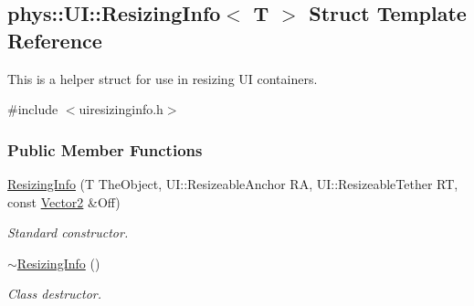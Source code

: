 \hypertarget{structphys_1_1UI_1_1ResizingInfo}{
\subsection{phys::UI::ResizingInfo$<$ T $>$ Struct Template Reference}
\label{structphys_1_1UI_1_1ResizingInfo}
}


This is a helper struct for use in resizing UI containers.  




{\ttfamily \#include $<$uiresizinginfo.h$>$}

\subsubsection*{Public Member Functions}
\begin{DoxyCompactItemize}
\item 
\hyperlink{structphys_1_1UI_1_1ResizingInfo_ae1a05f302e6e8f63773be6daf945f85d}{ResizingInfo} (T TheObject, UI::ResizeableAnchor RA, UI::ResizeableTether RT, const \hyperlink{classphys_1_1Vector2}{Vector2} \&Off)
\begin{DoxyCompactList}\small\item\em Standard constructor. \item\end{DoxyCompactList}\item 
\hypertarget{structphys_1_1UI_1_1ResizingInfo_a4443b66121aff4be05676e11a1bbe987}{
\hyperlink{structphys_1_1UI_1_1ResizingInfo_a4443b66121aff4be05676e11a1bbe987}{$\sim$ResizingInfo} ()}
\label{structphys_1_1UI_1_1ResizingInfo_a4443b66121aff4be05676e11a1bbe987}

\begin{DoxyCompactList}\small\item\em Class destructor. \item\end{DoxyCompactList}\end{DoxyCompactItemize}

